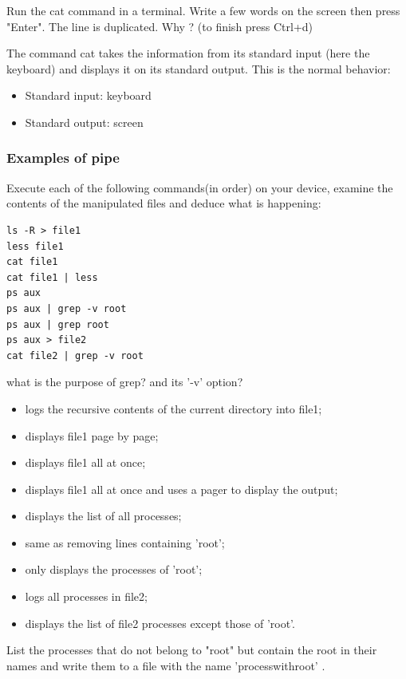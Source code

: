 \documentclass[11pt]{article}
\begin{document}
Run the cat command in a terminal.
Write a few words on the screen then press "Enter".
The line is duplicated. Why ? (to finish press Ctrl+d)

\begin{solution}
The command cat takes the information from its standard input (here the keyboard) and displays it on its standard output.
This is the normal behavior:
 \begin{itemize}
  \item Standard input: keyboard
  \item Standard output: screen
 \end{itemize}
\end{solution}

\subsubsection{Examples of pipe}

Execute each of the following commands(in order) on your device, examine the contents of the manipulated files and deduce what is happening:

\begin{lstlisting}
ls -R > file1
less file1
cat file1
cat file1 | less
ps aux
ps aux | grep -v root
ps aux | grep root
ps aux > file2
cat file2 | grep -v root
\end{lstlisting}

 what is the purpose of grep? and its '-v' option?

\begin{solution}
 \begin{itemize}
  \item logs the recursive contents of the current directory into file1;
  \item displays file1 page by page;
  \item displays file1 all at once;
  \item displays file1 all at once and uses a pager to display the output;
  \item displays the list of all processes;
  \item same as removing lines containing 'root';
  \item only displays the processes of 'root';
  \item logs all processes in file2;
  \item displays the list of file2 processes except those of 'root'.
 \end{itemize}
\end{solution}
\smallskip
\noindent List the processes that do not belong to "root" but contain the root in their names and write them to a file with the name 'processwithroot' .
\end{document}
